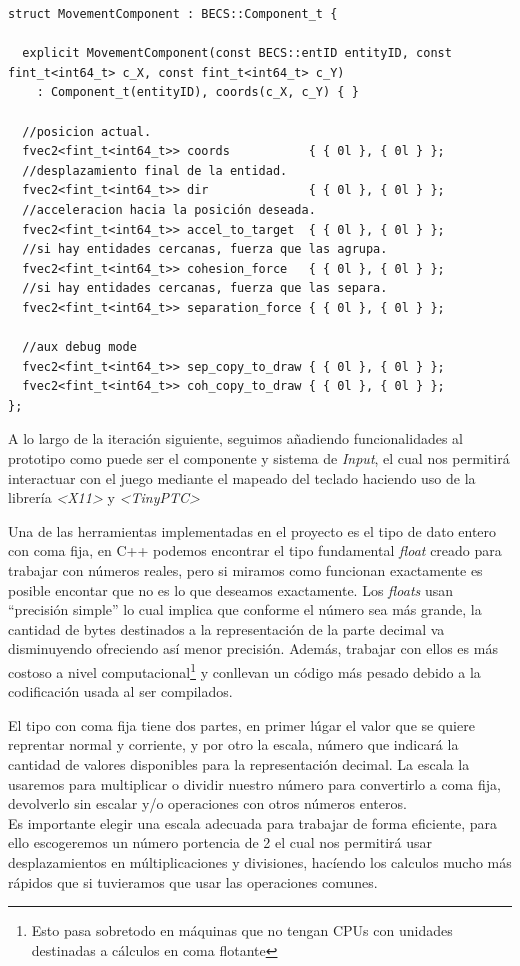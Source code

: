 \begin{lstlisting}[style=CodigoC++, caption={Componente de Movimiento},label=mov_cmp]
struct MovementComponent : BECS::Component_t {

  explicit MovementComponent(const BECS::entID entityID, const fint_t<int64_t> c_X, const fint_t<int64_t> c_Y) 
    : Component_t(entityID), coords(c_X, c_Y) { }

  //posicion actual.
  fvec2<fint_t<int64_t>> coords           { { 0l }, { 0l } };
  //desplazamiento final de la entidad.
  fvec2<fint_t<int64_t>> dir              { { 0l }, { 0l } };
  //acceleracion hacia la posición deseada.
  fvec2<fint_t<int64_t>> accel_to_target  { { 0l }, { 0l } };
  //si hay entidades cercanas, fuerza que las agrupa.
  fvec2<fint_t<int64_t>> cohesion_force   { { 0l }, { 0l } };
  //si hay entidades cercanas, fuerza que las separa.
  fvec2<fint_t<int64_t>> separation_force { { 0l }, { 0l } };

  //aux debug mode
  fvec2<fint_t<int64_t>> sep_copy_to_draw { { 0l }, { 0l } };
  fvec2<fint_t<int64_t>> coh_copy_to_draw { { 0l }, { 0l } };
};
\end{lstlisting}

A lo largo de la iteración siguiente, seguimos añadiendo funcionalidades al prototipo como puede 
ser el componente y sistema de \textit{Input}, el cual nos permitirá interactuar con el juego
mediante el mapeado del teclado haciendo uso de la librería \textit{\textless X11\textgreater}
y \textit{\textless TinyPTC\textgreater}

Una de las herramientas implementadas en el proyecto es el tipo de dato entero con coma fija,
en C++ podemos encontrar el tipo fundamental \textit{float} creado para trabajar con números 
reales, pero si miramos como funcionan exactamente es posible encontar que no es lo que deseamos
exactamente. Los \textit{floats} usan ``precisión simple'' lo cual implica que conforme el número 
sea más grande, la cantidad de bytes destinados a la representación de la parte decimal va 
disminuyendo ofreciendo así menor precisión. Además, trabajar con ellos es más costoso a nivel
computacional\footnote{Esto pasa sobretodo en máquinas que no tengan CPUs con unidades destinadas 
a cálculos en coma flotante} y conllevan un código más pesado debido a la codificación usada 
al ser compilados.

El tipo con coma fija tiene dos partes, en primer lúgar el valor que se quiere reprentar normal
y corriente, y por otro la escala, número que indicará la cantidad de valores disponibles
para la representación decimal. La escala la usaremos para multiplicar o dividir nuestro número
para convertirlo a coma fija, devolverlo sin escalar y/o operaciones con otros números enteros.\\
Es importante elegir una escala adecuada para trabajar de forma eficiente, para ello escogeremos
un número portencia de 2 el cual nos permitirá usar desplazamientos en múltiplicaciones y divisiones,
hacíendo los calculos mucho más rápidos que si tuvieramos que usar las operaciones comunes.

